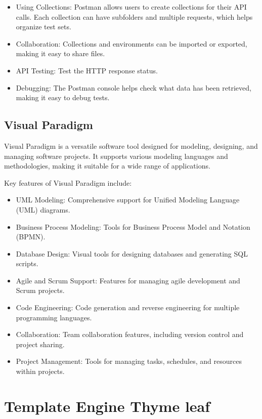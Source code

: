 \documentclass[../Main.tex]{subfiles}
\begin{document}
\begin{itemize}
    \item Using Collections: Postman allows users to create collections for their API calls.
          Each collection can have subfolders and multiple requests, which helps organize test sets.
    \item Collaboration: Collections and environments can be imported or exported, making it easy to share files.
    \item API Testing: Test the HTTP response status.
    \item Debugging: The Postman console helps check what data has been retrieved, making it easy to debug tests.
\end{itemize}

\subsection{Visual Paradigm}

Visual Paradigm is a versatile software tool designed for modeling, designing, and managing software projects.
It supports various modeling languages and methodologies, making it suitable for a wide range of applications.

Key features of Visual Paradigm include:
\begin{itemize}
    \item UML Modeling: Comprehensive support for Unified Modeling Language (UML) diagrams.
    \item Business Process Modeling: Tools for Business Process Model and Notation (BPMN).
    \item Database Design: Visual tools for designing databases and generating SQL scripts.
    \item Agile and Scrum Support: Features for managing agile development and Scrum projects.
    \item Code Engineering: Code generation and reverse engineering for multiple programming languages.
    \item Collaboration: Team collaboration features, including version control and project sharing.
    \item Project Management: Tools for managing tasks, schedules, and resources within projects.
\end{itemize}

\section{Template Engine Thyme leaf}
\end{document}
